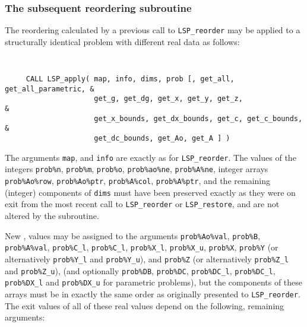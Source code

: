 \documentclass{galahad}
\newcommand{\packagename}{LSP}
\begin{document}

\subsubsection{The subsequent reordering subroutine}
The reordering calculated by a previous call to {\tt \packagename\_reorder} 
may be applied to a structurally identical problem with different real data 
as follows:

\vspace*{-2mm}
{\tt 
\begin{verbatim}
     CALL LSP_apply( map, info, dims, prob [, get_all, get_all_parametric, &
                     get_g, get_dg, get_x, get_y, get_z,                   &
                     get_x_bounds, get_dx_bounds, get_c, get_c_bounds,     &
                     get_dc_bounds, get_Ao, get_A ] )
\end{verbatim}
}
\vspace*{-1mm}
\noindent
The arguments {\tt map}, and {\tt info} are exactly as for 
{\tt \packagename\_reorder}. The values of the integers 
{\tt prob\%n}, {\tt prob\%m}, {\tt prob\%o}, 
{\tt prob\%ao\%ne}, {\tt prob\%A\%ne},
integer arrays {\tt prob\%Ao\%row}, {\tt prob\%Ao\%ptr}, 
{\tt prob\%A\%col}, {\tt prob\%A\%ptr}, and the remaining (integer) 
components of {\tt dims} must 
have been preserved exactly as they were on exit from the most recent 
call to {\tt \packagename\_reorder} or {\tt \packagename\_restore}, 
and are not altered by the subroutine. 

New \realdp, values may be assigned to the arguments 
{\tt prob\%Ao\%val}, {\tt prob\%B}, {\tt prob\%A\%val}, {\tt prob\%C\_l}, 
{\tt prob\%C\_l}, {\tt prob\%X\_l}, {\tt prob\%X\_u}, {\tt prob\%X}, 
{\tt prob\%Y} 
(or alternatively {\tt prob\%Y\_l} and {\tt prob\%Y\_u}), 
and {\tt prob\%Z}
(or alternatively {\tt prob\%Z\_l} and {\tt prob\%Z\_u}), 
(and optionally 
{\tt prob\%DB}, {\tt prob\%DC}, {\tt prob\%DC\_l}, {\tt prob\%DC\_l}, 
{\tt prob\%DX\_l} and {\tt prob\%DX\_u} for parametric problems), 
but the components of these arrays 
must be in exactly the same order as originally presented to 
{\tt \packagename\_reorder}. 
The exit values of all of these real values depend on the following, 
remaining arguments: 
\end{document}
